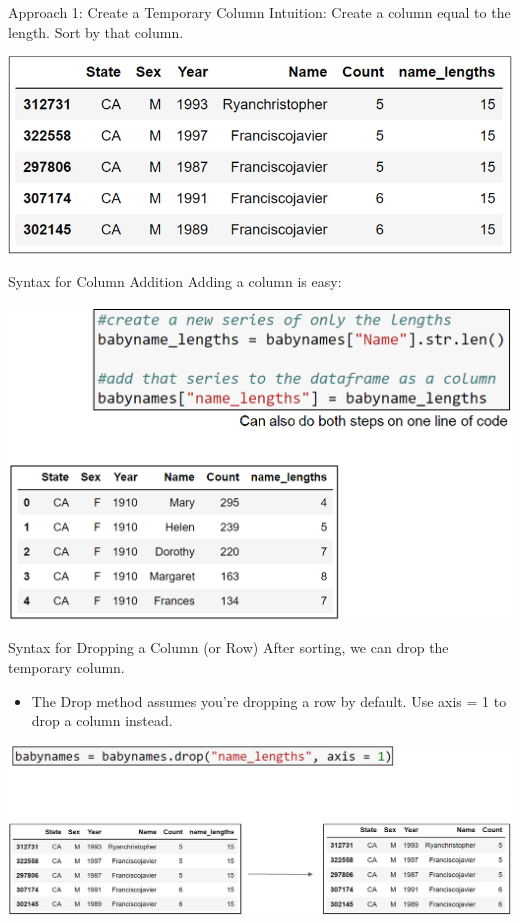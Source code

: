 \documentclass[aspectratio=169]{../latex_main/tntbeamer}  %
\begin{document}
	
	\begin{frame}[c]{Approach 1: Create a Temporary Column}
        Intuition: Create a column equal to the length. Sort by that column.

	   \includegraphics[scale=.74]{Bild12}\\
	\end{frame}
	
	
	\begin{frame}[c]{Syntax for Column Addition}
        Adding a column is easy:

    \hfill
	   \includegraphics[scale=.37]{Bild13}\\
	\end{frame}
	
	
	\begin{frame}[c]{Syntax for Dropping a Column (or Row)}
        After sorting, we can drop the temporary column.
        \begin{itemize}
            \item The Drop method assumes you’re dropping a row by default. Use axis = 1 to drop a column instead.
        \end{itemize}
	   \includegraphics[scale=.37]{Bild14}\\
	\end{frame}
	
\end{document}
